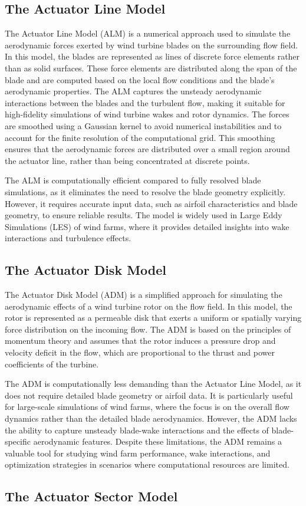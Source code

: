 \subsection{The Actuator Line Model} 

The Actuator Line Model (ALM) is a numerical approach used to simulate the aerodynamic forces exerted by wind turbine blades on the surrounding flow field. In this model, the blades are represented as lines of discrete force elements rather than as solid surfaces. These force elements are distributed along the span of the blade and are computed based on the local flow conditions and the blade's aerodynamic properties. The ALM captures the unsteady aerodynamic interactions between the blades and the turbulent flow, making it suitable for high-fidelity simulations of wind turbine wakes and rotor dynamics. The forces are smoothed using a Gaussian kernel to avoid numerical instabilities and to account for the finite resolution of the computational grid. This smoothing ensures that the aerodynamic forces are distributed over a small region around the actuator line, rather than being concentrated at discrete points.

The ALM is computationally efficient compared to fully resolved blade simulations, as it eliminates the need to resolve the blade geometry explicitly. However, it requires accurate input data, such as airfoil characteristics and blade geometry, to ensure reliable results. The model is widely used in Large Eddy Simulations (LES) of wind farms, where it provides detailed insights into wake interactions and turbulence effects.

\subsection{The Actuator Disk Model} 

The Actuator Disk Model (ADM) is a simplified approach for simulating the aerodynamic effects of a wind turbine rotor on the flow field. In this model, the rotor is represented as a permeable disk that exerts a uniform or spatially varying force distribution on the incoming flow. The ADM is based on the principles of momentum theory and assumes that the rotor induces a pressure drop and velocity deficit in the flow, which are proportional to the thrust and power coefficients of the turbine.

The ADM is computationally less demanding than the Actuator Line Model, as it does not require detailed blade geometry or airfoil data. It is particularly useful for large-scale simulations of wind farms, where the focus is on the overall flow dynamics rather than the detailed blade aerodynamics. However, the ADM lacks the ability to capture unsteady blade-wake interactions and the effects of blade-specific aerodynamic features. Despite these limitations, the ADM remains a valuable tool for studying wind farm performance, wake interactions, and optimization strategies in scenarios where computational resources are limited.
\subsection{The Actuator Sector Model} 
